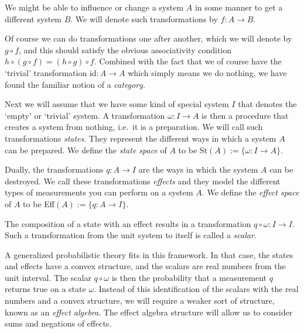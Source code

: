 \documentclass[a4paper,onecolumn,10pt,accepted=2019-05-03, issue=1, volume=1, shorttitle=papers/compositionality-1-1]{compositionalityarticle}
\numberwithin{counter}{section}
\newcommand{\id}{\text{id}}
\begin{document}
We might be able to influence or change a system $A$ in some manner to get a different system $B$. We will denote such transformations by $f:A\rightarrow B$.

Of course we can do transformations one after another, which we will denote by $g\circ f$, and this should satisfy the obvious associativity condition $h\circ(g\circ f) = (h\circ g)\circ f$. Combined with the fact that we of course have the `trivial' transformation $\id: A\rightarrow A$ which simply means we do nothing, we have found the familiar notion of a \emph{category}.

Next we will assume that we have some kind of special system $I$ that denotes the `empty' or `trivial' system. A transformation $\omega:I\rightarrow A$ is then a procedure that creates a system from nothing, i.e.\ it is a preparation. We will call such transformations \emph{states}. They represent the different ways in which a system $A$ can be prepared. We define the \emph{state space} of $A$ to be St$(A):=\{\omega: I\rightarrow A\}$.

Dually, the transformations $q:A\rightarrow I$ are the ways in which the system $A$ can be destroyed. We call these transformations \emph{effects} and they model the different types of measurements you can perform on a system $A$. We define the \emph{effect space} of $A$ to be Eff$(A):=\{q:A\rightarrow I\}$.

The composition of a state with an effect results in a transformation $q\circ\omega: I\rightarrow I$. Such a transformation from the unit system to itself is called a \emph{scalar}. 

A generalized probabilistic theory fits in this framework. In that case, the states and effects have a convex structure, and the scalars are real numbers from the unit interval. The scalar $q\circ \omega$ is then the probability that a measurement $q$ returns true on a state $\omega$. 
Instead of this identification of the scalars with the real numbers and a convex structure, we will require a weaker sort of structure, known as an \emph{effect algebra}. The effect algebra structure will allow us to consider sums and negations of effects.
\end{document}
